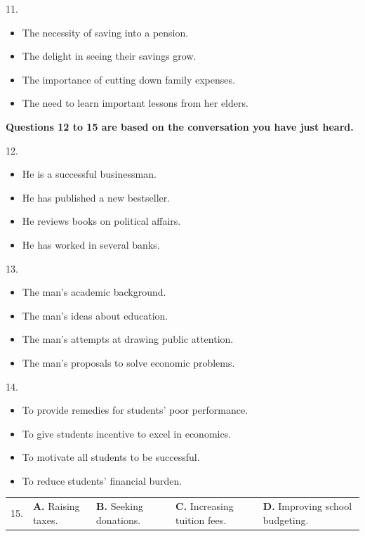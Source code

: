 \documentclass[UTF8,11pt]{ctexart}
\begin{document}
11.


\begin{itemize}[leftmargin=2em,itemsep=.2em,topsep=.4em]\item[A.] The necessity of saving into a pension.
\item[B.] The delight in seeing their savings grow.
\item[C.] The importance of cutting down family expenses.
\item[D.] The need to learn important lessons from her elders.
\end{itemize}

\textbf{Questions 12 to 15 are based on the conversation you have just heard.}


12.


\begin{itemize}[leftmargin=2em,itemsep=.2em,topsep=.4em]\item[A.] He is a successful businessman.
\item[B.] He has published a new bestseller.
\item[C.] He reviews books on political affairs.
\item[D.] He has worked in several banks.
\end{itemize}

13.


\begin{itemize}[leftmargin=2em,itemsep=.2em,topsep=.4em]\item[A.] The man’s academic background.
\item[B.] The man’s ideas about education.
\item[C.] The man’s attempts at drawing public attention.
\item[D.] The man’s proposals to solve economic problems.
\end{itemize}

14.


\begin{itemize}[leftmargin=2em,itemsep=.2em,topsep=.4em]\item[A.] To provide remedies for students’ poor performance.
\item[B.] To give students incentive to excel in economics.
\item[C.] To motivate all students to be successful.
\item[D.] To reduce students’ financial burden.
\end{itemize}

\noindent\begin{tabularx}{\linewidth}{@{}lXXXX@{}}15. & \textbf{A.} Raising taxes. & \textbf{B.} Seeking donations. & \textbf{C.} Increasing tuition fees. & \textbf{D.} Improving school budgeting.\\\end{tabularx}\par
\end{document}
